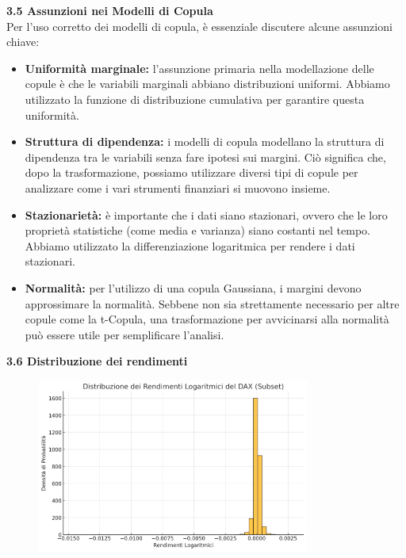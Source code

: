 \documentclass[a4paper,12pt]{article}
\begin{document}
\noindent\textbf{3.5 Assunzioni nei Modelli di Copula } \\

\noindent Per l'uso corretto dei modelli di copula, è essenziale discutere alcune assunzioni chiave:\\

\begin{itemize}
	\item \textbf{Uniformità marginale:} l'assunzione primaria nella modellazione delle copule è che le variabili marginali abbiano distribuzioni uniformi. Abbiamo utilizzato la funzione di distribuzione cumulativa per garantire questa uniformità.
	\item \textbf{Struttura di dipendenza:} i modelli di copula modellano la struttura di dipendenza tra le variabili senza fare ipotesi sui margini. Ciò significa che, dopo la trasformazione, possiamo utilizzare diversi tipi di copule per analizzare come i vari strumenti finanziari si muovono insieme.
	\item \textbf{Stazionarietà:} è importante che i dati siano stazionari, ovvero che le loro proprietà statistiche (come media e varianza) siano costanti nel tempo. Abbiamo utilizzato la differenziazione logaritmica per rendere i dati stazionari.
	\item \textbf{Normalità:} per l'utilizzo di una copula Gaussiana, i margini devono approssimare la normalità. Sebbene non sia strettamente necessario per altre copule come la t-Copula, una trasformazione per avvicinarsi alla normalità può essere utile per semplificare l'analisi.
\end{itemize}

\noindent\textbf{3.6 Distribuzione dei rendimenti} \\

\begin{figure}[h] %
	\centering %
	\includegraphics[width=0.8\textwidth]{rendimenti.png} %
	\label{fig:immagine} %
\end{figure}
\end{document}
